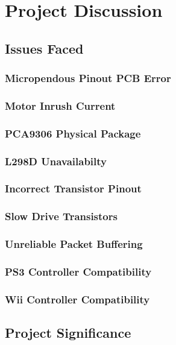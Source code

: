 \chapter{Project Discussion}
\label{chp:discussion}


\section{Issues Faced}


\subsection{Micropendous Pinout PCB Error}


\subsection{Motor Inrush Current}


\subsection{PCA9306 Physical Package}


\subsection{L298D Unavailabilty}


\subsection{Incorrect Transistor Pinout}


\subsection{Slow Drive Transistors}


\subsection{Unreliable Packet Buffering}


\subsection{PS3 Controller Compatibility}


\subsection{Wii Controller Compatibility}


\section{Project Significance}

